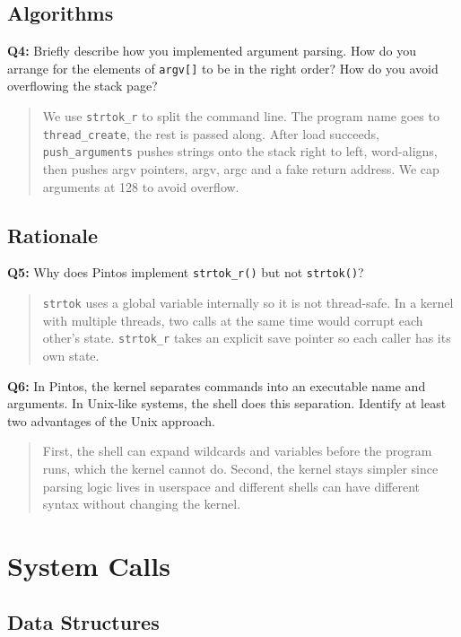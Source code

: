 \documentclass[a4paper,11pt]{paper}
\begin{document}
\subsection{Algorithms}


\textbf{Q4:} Briefly describe how you implemented argument parsing.  How do you arrange for the elements of \texttt{argv[]} to be in the right order? How do you avoid overflowing the stack page?
\begin{quote}
We use \texttt{strtok\_r} to split the command line. The program name
goes to \texttt{thread\_create}, the rest is passed along. After load
succeeds, \texttt{push\_arguments} pushes strings onto the stack right
to left, word-aligns, then pushes argv pointers, argv, argc and a fake
return address. We cap arguments at 128 to avoid overflow.
\end{quote}

\subsection{Rationale}

\textbf{Q5:} Why does Pintos implement \texttt{strtok\_r()} but not \texttt{strtok()}?
\begin{quote}
\texttt{strtok} uses a global variable internally so it is not thread-safe.
In a kernel with multiple threads, two calls at the same time would
corrupt each other's state. \texttt{strtok\_r} takes an explicit save
pointer so each caller has its own state.
\end{quote}

\textbf{Q6:} In Pintos, the kernel separates commands into an executable name and arguments.  In Unix-like systems, the shell does this separation.  Identify at least two advantages of the Unix approach.
\begin{quote}
First, the shell can expand wildcards and variables before the program
runs, which the kernel cannot do. Second, the kernel stays simpler since
parsing logic lives in userspace and different shells can have different
syntax without changing the kernel.
\end{quote}


\section{System Calls}

\subsection{Data Structures}
\end{document}
